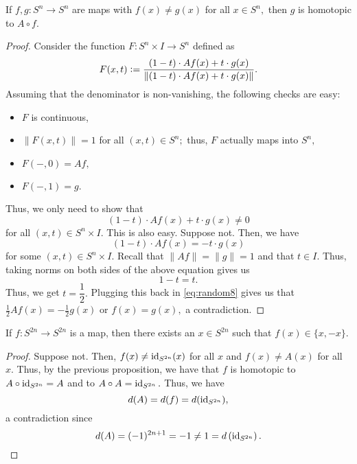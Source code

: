 \documentclass[12pt]{article}
\begin{document}
\begin{prop}
	If $f, g : S^n \to S^n$ are maps with $f(x) \neq g(x)$ for all $x \in S^n,$ then $g$ is homotopic to $A \circ f.$
\end{prop}
\begin{proof} 
	Consider the function $F:S^n \times I \to S^n$ defined as
	\begin{equation*} 
		F(x, t) \vcentcolon= \dfrac{(1 - t)\cdot Af(x) + t\cdot g(x)}{\|(1 - t)\cdot Af(x) + t\cdot g(x)\|}.
	\end{equation*}
	Assuming that the denominator is non-vanishing, the following checks are easy:
	\begin{itemize}
		\item $F$ is continuous,
		\item $\|F(x, t)\| = 1$ for all $(x, t) \in S^n;$ thus, $F$ actually maps into $S^n,$
		\item $F(-, 0) = Af,$
		\item $F(-, 1) = g.$
	\end{itemize}

	Thus, we only need to show that
	\begin{equation*} 
		(1 - t)\cdot Af(x) + t\cdot g(x) \neq 0 
	\end{equation*}
	for all $(x, t) \in S^n \times I.$ This is also easy. Suppose not. Then, we have
	\begin{equation} \tag{$*$} \label{eq:random8}
		(1 - t)\cdot Af(x) = -t\cdot g(x) 
	\end{equation}
	for some $(x, t) \in S^n \times I.$ Recall that $\|Af\| = \|g\| = 1$ and that $t \in I.$ Thus, taking norms on both sides of the above equation gives us
	\begin{equation*} 
		1 - t = t.
	\end{equation*}
	Thus, we get $t = \dfrac{1}{2}.$ Plugging this back in \cref{eq:random8} gives us that $\frac{1}{2}Af(x) = -\frac{1}{2}g(x)$ or $f(x) = g(x),$ a contradiction.
\end{proof}

\begin{cor}
	If $f:S^{2n} \to S^{2n}$ is a map, then there exists an $x \in S^{2n}$ such that $f(x) \in \{x, -x\}.$
\end{cor}
\begin{proof} 
	Suppose not. Then, $f(x) \neq \operatorname{id}_{S^{2n}}(x)$ for all $x$ and $f(x) \neq A(x)$ for all $x.$ Thus, by the previous proposition, we have that $f$ is homotopic to $A \circ \operatorname{id}_{S^{2n}} = A$ and to $A \circ A = \operatorname{id}_{S^{2n}}.$ Thus, we have
	\begin{equation*} 
		d(A) = d(f) = d(\operatorname{id}_{S^{2n}}),
	\end{equation*}
	a contradiction since
	\begin{equation*} 
		d(A) = (-1)^{2n+1} = -1 \neq 1 = d\left(\operatorname{id}_{S^{2n}}\right). \qedhere
	\end{equation*}
\end{proof}
\end{document}
